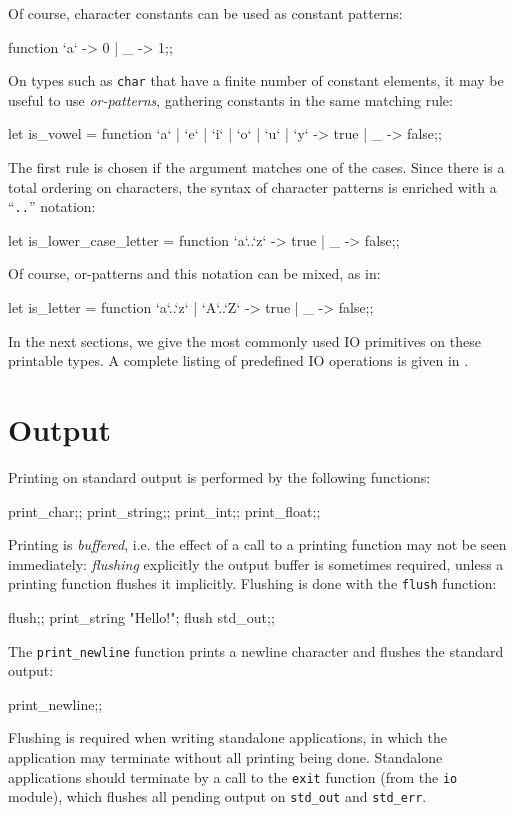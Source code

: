 Of course, character constants can be used as constant patterns:
\begin{caml_example}
function `a` -> 0 | _ -> 1;;
\end{caml_example}
On types such as {\tt char} that have a finite number of constant
elements, it may be useful to use {\em or-patterns}, gathering
constants in the same matching rule:
\begin{caml_example}
let is_vowel = function
  `a` | `e` | `i` | `o` | `u` | `y` -> true
| _ -> false;;
\end{caml_example}
The first rule is chosen if the argument matches one of the cases.
Since there is a total ordering on characters, the syntax of character
patterns is enriched with a ``\verb|..|'' notation:
\begin{caml_example}
let is_lower_case_letter = function
  `a`..`z` -> true
| _ -> false;;
\end{caml_example}
Of course, or-patterns and this notation can be mixed, as in:
\begin{caml_example}
let is_letter = function
  `a`..`z` | `A`..`Z` -> true
| _ -> false;;
\end{caml_example}

In the next sections, we give the most commonly used IO primitives on
these printable types. A complete listing of predefined IO operations
is given in \cite{CamlLightDoc}.

\section{Output}

Printing on standard output is performed by the following
functions:
\begin{caml_example}
print_char;;
print_string;;
print_int;;
print_float;;
\end{caml_example}
Printing is {\em buffered}, i.e. the effect of a call to a printing
function may not be seen immediately: {\em flushing} explicitly the
output buffer is sometimes required, unless a printing function
flushes it implicitly. Flushing is done with the {\tt flush}
function:
\begin{caml_example}
flush;;
print_string "Hello!"; flush std_out;;
\end{caml_example}
The \verb|print_newline| function prints a newline character and
flushes the standard output:
\begin{caml_example}
print_newline;;
\end{caml_example}
Flushing is required when writing standalone applications, in which
the application may terminate without all printing being done.
Standalone applications should terminate by a call to the {\tt exit}
function (from the {\tt io} module), which flushes all pending output on
\verb|std_out| and
\verb|std_err|.

